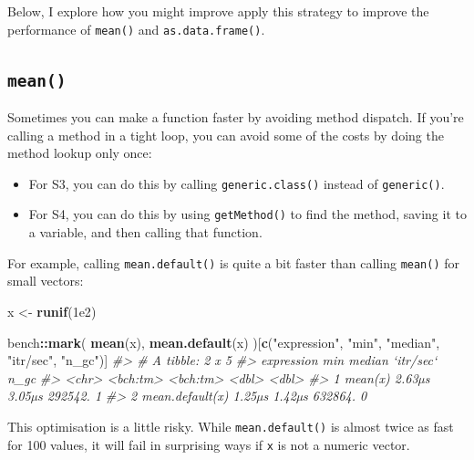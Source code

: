 \documentclass[]{book}
\makeatletter
\newenvironment{Shaded}{\begin{snugshade}}{\end{snugshade}}
\newcommand{\CommentTok}[1]{\textcolor[rgb]{0.37,0.37,0.37}{\textit{#1}}}
\newcommand{\FloatTok}[1]{\textcolor[rgb]{0.06,0.06,0.06}{#1}}
\newcommand{\KeywordTok}[1]{\textcolor[rgb]{0.27,0.27,0.27}{\textbf{#1}}}
\newcommand{\NormalTok}[1]{#1}
\newcommand{\OperatorTok}[1]{\textcolor[rgb]{0.43,0.43,0.43}{\textbf{#1}}}
\newcommand{\StringTok}[1]{\textcolor[rgb]{0.5,0.5,0.5}{#1}}
\newcommand{\indexc}[1]{\index{#1@\texttt{#1}}}
\makeatother
\begin{document}
Below, I explore how you might improve apply this strategy to improve the performance of \texttt{mean()} and \texttt{as.data.frame()}.

\hypertarget{mean}{%
\subsection{\texorpdfstring{\texttt{mean()}}{mean()}}\label{mean}}

\indexc{.Internal()}


Sometimes you can make a function faster by avoiding method dispatch. If you're calling a method in a tight loop, you can avoid some of the costs by doing the method lookup only once:

\begin{itemize}
\item
  For S3, you can do this by calling \texttt{generic.class()} instead of \texttt{generic()}.
\item
  For S4, you can do this by using \texttt{getMethod()} to find the method, saving
  it to a variable, and then calling that function.
\end{itemize}

For example, calling \texttt{mean.default()} is quite a bit faster than calling \texttt{mean()} for small vectors:

\begin{Shaded}
\begin{Highlighting}[]
\NormalTok{x <-}\StringTok{ }\KeywordTok{runif}\NormalTok{(}\FloatTok{1e2}\NormalTok{)}

\NormalTok{bench}\OperatorTok{::}\KeywordTok{mark}\NormalTok{(}
  \KeywordTok{mean}\NormalTok{(x),}
  \KeywordTok{mean.default}\NormalTok{(x)}
\NormalTok{)[}\KeywordTok{c}\NormalTok{(}\StringTok{"expression"}\NormalTok{, }\StringTok{"min"}\NormalTok{, }\StringTok{"median"}\NormalTok{, }\StringTok{"itr/sec"}\NormalTok{, }\StringTok{"n_gc"}\NormalTok{)]}
\CommentTok{#> # A tibble: 2 x 5}
\CommentTok{#>   expression           min   median `itr/sec`  n_gc}
\CommentTok{#>   <chr>           <bch:tm> <bch:tm>     <dbl> <dbl>}
\CommentTok{#> 1 mean(x)           2.63µs   3.05µs   292542.     1}
\CommentTok{#> 2 mean.default(x)   1.25µs   1.42µs   632864.     0}
\end{Highlighting}
\end{Shaded}

This optimisation is a little risky. While \texttt{mean.default()} is almost twice as fast for 100 values, it will fail in surprising ways if \texttt{x} is not a numeric vector.
\end{document}
